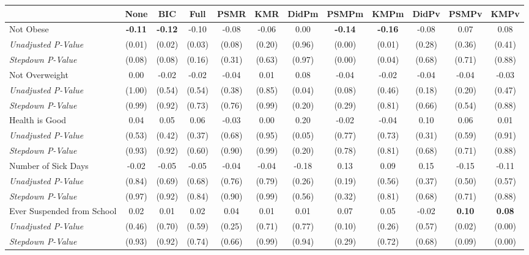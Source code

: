 \begin{tabular}{l c c c c c c c c c c c}
\toprule
 & None & BIC & Full & PSMR & KMR & DidPm & PSMPm & KMPm & DidPv & PSMPv & KMPv \\
\midrule
Not Obese & \textbf{ -0.11 } & \textbf{ -0.12 } & -0.10 & -0.08 & -0.06 & 0.00 & \textbf{ -0.14 } & \textbf{ -0.16 } & -0.08 & 0.07 & 0.08 \\
\quad \textit{Unadjusted P-Value} & (0.01) & (0.02) & (0.03) & (0.08) & (0.20) & (0.96) & (0.00) & (0.01) & (0.28) & (0.36) & (0.41) \\
\quad \textit{Stepdown P-Value} & (0.08) & (0.08) & (0.16) & (0.31) & (0.63) & (0.97) & (0.00) & (0.04) & (0.68) & (0.71) & (0.88) \\
Not Overweight & 0.00 & -0.02 & -0.02 & -0.04 & 0.01 & 0.08 & -0.04 & -0.02 & -0.04 & -0.04 & -0.03 \\
\quad \textit{Unadjusted P-Value} & (1.00) & (0.54) & (0.54) & (0.38) & (0.85) & (0.04) & (0.08) & (0.46) & (0.18) & (0.20) & (0.47) \\
\quad \textit{Stepdown P-Value} & (0.99) & (0.92) & (0.73) & (0.76) & (0.99) & (0.20) & (0.29) & (0.81) & (0.66) & (0.54) & (0.88) \\
Health is Good & 0.04 & 0.05 & 0.06 & -0.03 & 0.00 & 0.20 & -0.02 & -0.04 & 0.10 & 0.06 & 0.01 \\
\quad \textit{Unadjusted P-Value} & (0.53) & (0.42) & (0.37) & (0.68) & (0.95) & (0.05) & (0.77) & (0.73) & (0.31) & (0.59) & (0.91) \\
\quad \textit{Stepdown P-Value} & (0.93) & (0.92) & (0.60) & (0.90) & (0.99) & (0.20) & (0.78) & (0.81) & (0.68) & (0.71) & (0.88) \\
Number of Sick Days & -0.02 & -0.05 & -0.05 & -0.04 & -0.04 & -0.18 & 0.13 & 0.09 & 0.15 & -0.15 & -0.11 \\
\quad \textit{Unadjusted P-Value} & (0.84) & (0.69) & (0.68) & (0.76) & (0.79) & (0.26) & (0.19) & (0.56) & (0.37) & (0.50) & (0.57) \\
\quad \textit{Stepdown P-Value} & (0.97) & (0.92) & (0.84) & (0.90) & (0.99) & (0.56) & (0.32) & (0.81) & (0.68) & (0.71) & (0.88) \\
Ever Suspended from School & 0.02 & 0.01 & 0.02 & 0.04 & 0.01 & 0.01 & 0.07 & 0.05 & -0.02 & \textbf{ 0.10 } & \textbf{ 0.08 } \\
\quad \textit{Unadjusted P-Value} & (0.46) & (0.70) & (0.59) & (0.25) & (0.71) & (0.77) & (0.10) & (0.26) & (0.57) & (0.02) & (0.00) \\
\quad \textit{Stepdown P-Value} & (0.93) & (0.92) & (0.74) & (0.66) & (0.99) & (0.94) & (0.29) & (0.72) & (0.68) & (0.09) & (0.00) \\
\bottomrule
\end{tabular}
